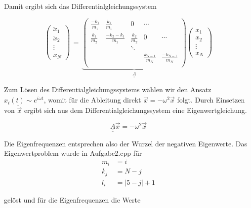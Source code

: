 \noindent
Damit ergibt sich das Differentialgleichungssystem

\begin{equation*}
  \left(\begin{array}{c} \ddot{x}_1 \\ \ddot{x}_2 \\ \vdots \\ \ddot{x}_N \end{array}\right)\, = \,
  \underbrace{\left(
        \begin{array}{ccccc}
          \frac{-k_1}{m_1} & \frac{k_1}{m_1} & 0 & \cdots & \\
          \frac{k_1}{m_2} & \frac{-k_2-k_1}{m_2} & \frac{k_2}{m_2} & 0 & \cdots \\
          & & \ddots & & \\
          & & & \frac{k_{N-1}}{m_N} & \frac{-k_{N-1}}{m_N}\\
        \end{array}\right)}_{\underline{\underline{A}}}
        \left(\begin{array}{c} x_1 \\ x_2 \\ \vdots \\ x_N \end{array}\right)
\end{equation*}

Zum Lösen des Differentialgleichungssystems wählen wir den Ansatz $x_i(t) \sim e^{i\omega t}$, womit für die Ableitung direkt $\ddot{\vec{x}} = -\omega^2 \vec{x}$ folgt. Durch Einsetzen von $\ddot{\vec{x}}$ ergibt sich aus dem Differentialgleichungssystem eine Eigenwertgleichung.

\begin{equation*}
  \underline{\underline{A}}\vec{x} = -\omega^2\vec{x}
\end{equation*}

\noindent
Die Eigenfrequenzen entsprechen also der Wurzel der negativen Eigenwerte. Das Eigenwertproblem wurde in Aufgabe2.cpp für
\begin{align*}
  m_i &= i \\
  k_j &= N-j \\
  l_i &= |5-j|+1
\end{align*}

\noindent
gelöst und für die Eigenfrequenzen die Werte

